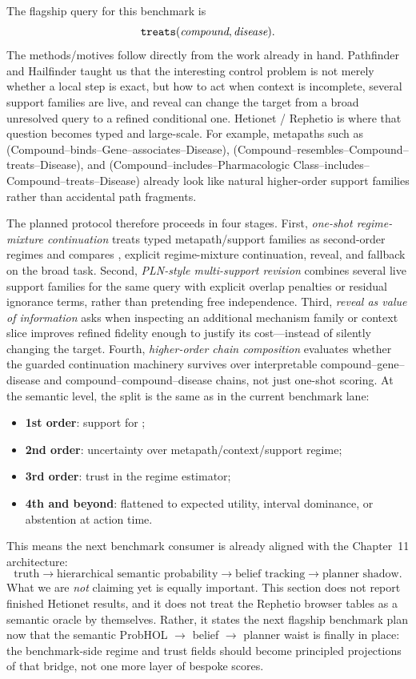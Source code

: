 \documentclass[11pt,openany]{report}
\begin{document}
The flagship query for this benchmark is
\[
  \texttt{treats}(\textit{compound}, \textit{disease}).
\]
The methods/motives follow directly from the work already in hand.
Pathfinder and Hailfinder taught us that the interesting control problem
is not merely whether a local step is exact, but how to act when context
is incomplete, several support families are live, and reveal can change
the target from a broad unresolved query to a refined conditional one.
Hetionet / Rephetio is where that question becomes typed and large-scale.
For example, metapaths such as
 (Compound--binds--Gene--associates--Disease),
 (Compound--resembles--Compound--treats--Disease), and
 (Compound--includes--Pharmacologic Class--includes--Compound--treats--Disease)
already look like natural higher-order support families rather than
accidental path fragments.
\par
The planned protocol therefore proceeds in four stages.  First,
\emph{one-shot regime-mixture continuation} treats typed
metapath/support families as second-order regimes and compares
, explicit regime-mixture continuation, reveal, and
fallback on the broad  task.  Second,
\emph{PLN-style multi-support revision} combines several live support
families for the same query with explicit overlap penalties or residual
ignorance terms, rather than pretending free independence.  Third,
\emph{reveal as value of information} asks when inspecting an additional
mechanism family or context slice improves refined fidelity enough to
justify its cost---instead of silently changing the target.  Fourth,
\emph{higher-order chain composition} evaluates whether the guarded
continuation machinery survives over interpretable
compound--gene--disease and compound--compound--disease chains, not just
one-shot scoring.
At the semantic level, the split is the same as in the current
benchmark lane:
\begin{itemize}
\item \textbf{1st order}: support for ;
\item \textbf{2nd order}: uncertainty over metapath/context/support
  regime;
\item \textbf{3rd order}: trust in the regime estimator;
\item \textbf{4th and beyond}: flattened to expected utility, interval
  dominance, or abstention at action time.
\end{itemize}
This means the next benchmark consumer is already aligned with the
Chapter~11 architecture:
\[
  \text{truth}
  \to \text{hierarchical semantic probability}
  \to \text{belief tracking}
  \to \text{planner shadow}.
\]
What we are \emph{not} claiming yet is equally important.  This section
does not report finished Hetionet results, and it does not treat the
Rephetio browser tables as a semantic oracle by themselves.  Rather, it
states the next flagship benchmark plan now that the semantic
ProbHOL $\rightarrow$ belief $\rightarrow$ planner waist is finally in
place: the benchmark-side regime and trust fields should become
principled projections of that bridge, not one more layer of bespoke
scores.
\end{document}
